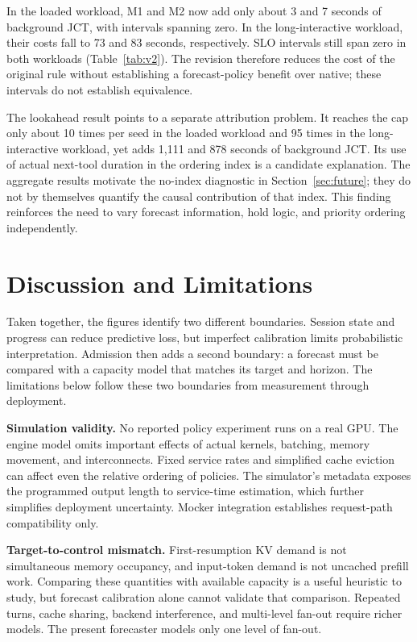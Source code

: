 \documentclass[11pt,a4paper]{article}
\begin{document}
In the loaded workload, M1 and M2 now add only about 3 and 7 seconds of background JCT, with intervals spanning zero. In the long-interactive workload, their costs fall to 73 and 83 seconds, respectively. SLO intervals still span zero in both workloads (Table~\ref{tab:v2}). The revision therefore reduces the cost of the original rule without establishing a forecast-policy benefit over native; these intervals do not establish equivalence.

The lookahead result points to a separate attribution problem. It reaches the cap only about 10 times per seed in the loaded workload and 95 times in the long-interactive workload, yet adds 1,111 and 878 seconds of background JCT. Its use of actual next-tool duration in the ordering index is a candidate explanation. The aggregate results motivate the no-index diagnostic in Section~\ref{sec:future}; they do not by themselves quantify the causal contribution of that index. This finding reinforces the need to vary forecast information, hold logic, and priority ordering independently.

\section{Discussion and Limitations}
\label{sec:7}

Taken together, the figures identify two different boundaries. Session state and progress can reduce predictive loss, but imperfect calibration limits probabilistic interpretation. Admission then adds a second boundary: a forecast must be compared with a capacity model that matches its target and horizon. The limitations below follow these two boundaries from measurement through deployment.

\textbf{Simulation validity.} No reported policy experiment runs on a real GPU. The engine model omits important effects of actual kernels, batching, memory movement, and interconnects. Fixed service rates and simplified cache eviction can affect even the relative ordering of policies. The simulator's metadata exposes the programmed output length to service-time estimation, which further simplifies deployment uncertainty. Mocker integration establishes request-path compatibility only.


\textbf{Target-to-control mismatch.} First-resumption KV demand is not simultaneous memory occupancy, and input-token demand is not uncached prefill work. Comparing these quantities with available capacity is a useful heuristic to study, but forecast calibration alone cannot validate that comparison. Repeated turns, cache sharing, backend interference, and multi-level fan-out require richer models. The present forecaster models only one level of fan-out.
\end{document}
